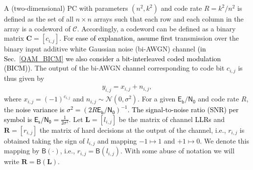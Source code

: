 \documentclass[journal]{IEEEtran}
\newcommand{\nc}{n}
\newcommand{\kc}{k}
\newcommand{\rr}{\boldsymbol{R}}
\newcommand{\cc}{\boldsymbol{C}}
\newcommand{\dmin}{d_\mathsf{min}}
\newcommand{\lalone}{\boldsymbol{L}}
\newcommand{\BB}{\mathsf{B}}
\newcommand{\Eb}{\mathsf{E_b}}
\newcommand{\Es}{\mathsf{E_s}}
\newcommand{\No}{\mathsf{N_0}}
\newcommand{\SH}{\textcolor{black}}
\newcommand{\AG}{\textcolor{black}}
\begin{document}
A (two-dimensional) PC with parameters $(\nc^2,\kc^2)$ and code rate  $R=\kc^2/\nc^2$ is defined as the set of all $\nc\times\nc$ arrays such that each row and each column in the array is a codeword of $\mathcal{C}$. Accordingly, a codeword can be defined as a binary matrix $\cc=[c_{i,j}]$.  
For \AG{ease of explanation, assume first} transmission over the binary input additive white Gaussian noise (bi-AWGN) channel \AG{(in Sec.~\ref{QAM_BICM} we also consider a bit-interleaved coded modulation (BICM))}. The output of the bi-AWGN channel corresponding to code bit $c_{i,j}$ is thus given by
\begin{align}\label{channel_inst}
y_{i,j}=x_{i,j}+n_{i,j},
\end{align}  
where $x_{i,j}=(-1)^{c_{i,j}}$ and $n_{i,j}\sim \mathcal{N}(0,\sigma^2)$. For a given $\Eb/\No$ and code rate $R$, the \AG{noise variance is $\sigma^2=(2 R
\Eb/\No)^{-1}$. The signal-to-noise ratio \SH{(SNR)} per symbol is  $\Es/\No=\frac{1}{2\sigma^2}$}. Let $\lalone=[l_{i,j}]$ be the matrix of channel \AG{LLRs} and $\rr=[r_{i,j}]$ the matrix of hard decisions at the output of the channel, i.e., $r_{i,j}$ is obtained taking the sign of $l_{i,j}$ and mapping $- 1 \mapsto 1$ and $+ 1 \mapsto 0$. We denote this mapping by $\BB(\cdot)$, i.e., $r_{i,j}=\BB(l_{i,j})$.  
With some abuse of notation we will write $\rr=\BB(\lalone)$.
\end{document}
